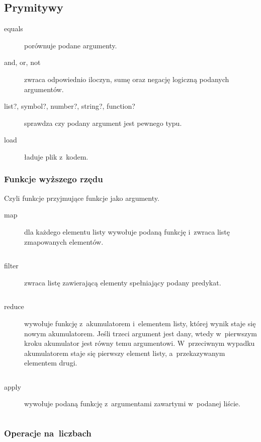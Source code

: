 \documentclass[a4paper,11pt]{article}
\newcommand{\clj}[1]{
\inputminted[fontsize=\footnotesize,frame=single,samepage=true]{clojure}{code/#1.clj}
}
\begin{document}
\subsection{Prymitywy}

\begin{description}
\item[equals] porównuje podane argumenty.

\item[and, or, not] zwraca odpowiednio iloczyn, sumę oraz negację logiczną
  podanych argumentów.

\item[list?, symbol?, number?, string?, function?] sprawdza czy podany argument
  jest pewnego typu.

\item[load] ładuje plik z~kodem.
\end{description}

\subsubsection{Funkcje wyższego rzędu}

Czyli funkcje przyjmujące funkcje jako argumenty.

\begin{description}
\item[map] dla każdego elementu listy wywołuje podaną funkcję i~zwraca listę
  zmapowanych elementów.
  \clj{map}

\item[filter] zwraca listę zawierającą elementy spełniający podany predykat.
  \clj{filter}

\item[reduce] wywołuje funkcję z~akumulatorem i~elementem listy, której wynik
  staje się nowym akumulatorem. Jeśli trzeci argument jest dany, wtedy
  w~pierwszym kroku akumulator jest równy temu argumentowi. W~przeciwnym
  wypadku akumulatorem staje się pierwszy element listy, a~przekazywanym
  elementem drugi.
  \clj{reduce}

\item[apply] wywołuje podaną funkcję z~argumentami zawartymi w~podanej liście.
  \clj{apply}

\end{description}

\subsubsection{Operacje na~liczbach}
\end{document}
